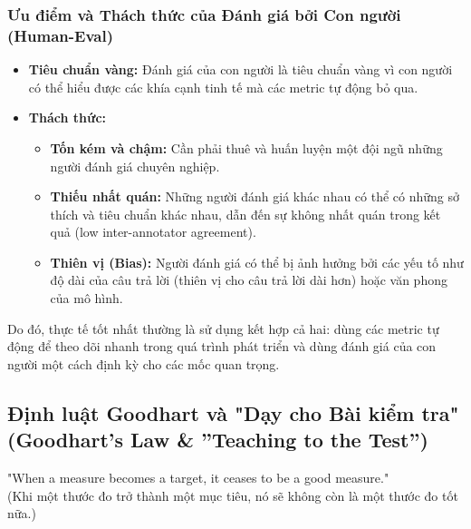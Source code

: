 \subsubsection{Ưu điểm và Thách thức của Đánh giá bởi Con người (Human-Eval)}
\begin{itemize}
    \item \textbf{Tiêu chuẩn vàng:} Đánh giá của con người là tiêu chuẩn vàng vì con người có thể hiểu được các khía cạnh tinh tế mà các metric tự động bỏ qua.
    \item \textbf{Thách thức:}
        \begin{itemize}
            \item \textbf{Tốn kém và chậm:} Cần phải thuê và huấn luyện một đội ngũ những người đánh giá chuyên nghiệp.
            \item \textbf{Thiếu nhất quán:} Những người đánh giá khác nhau có thể có những sở thích và tiêu chuẩn khác nhau, dẫn đến sự không nhất quán trong kết quả (low inter-annotator agreement).
            \item \textbf{Thiên vị (Bias):} Người đánh giá có thể bị ảnh hưởng bởi các yếu tố như độ dài của câu trả lời (thiên vị cho câu trả lời dài hơn) hoặc văn phong của mô hình.
        \end{itemize}
\end{itemize}
Do đó, thực tế tốt nhất thường là sử dụng kết hợp cả hai: dùng các metric tự động để theo dõi nhanh trong quá trình phát triển và dùng đánh giá của con người một cách định kỳ cho các mốc quan trọng.

\subsection{Định luật Goodhart và "Dạy cho Bài kiểm tra" (Goodhart's Law \& ''Teaching to the Test'')}
\label{ssec:goodharts_law}

\begin{tcolorbox}[
    title=Định luật Goodhart,
    colback=yellow!10!white, colframe=yellow!50!black, fonttitle=\bfseries
]
"When a measure becomes a target, it ceases to be a good measure." \\ (Khi một thước đo trở thành một mục tiêu, nó sẽ không còn là một thước đo tốt nữa.)
\end{tcolorbox}

